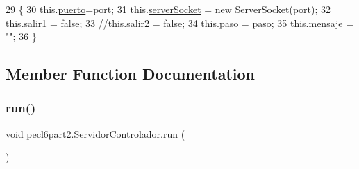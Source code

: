 \begin{DoxyCode}
29                                                                        \{
30       this.\mbox{\hyperlink{classpecl6part2_1_1_servidor_controlador_a685d8d2e3aba27e77af577046faadabe}{puerto}}=port;
31       this.\mbox{\hyperlink{classpecl6part2_1_1_servidor_controlador_ac114e889059ed268a9df9f1dc7447f4b}{serverSocket}} = \textcolor{keyword}{new} ServerSocket(port);
32       this.\mbox{\hyperlink{classpecl6part2_1_1_servidor_controlador_a1721c97ac463f940af370521ac8f78db}{salir1}} = \textcolor{keyword}{false};
33       \textcolor{comment}{//this.salir2 = false;}
34       this.\mbox{\hyperlink{classpecl6part2_1_1_servidor_controlador_a3d1fc8f640e9e8271b06bf8ae9ea1176}{paso}} = \mbox{\hyperlink{classpecl6part2_1_1_servidor_controlador_a3d1fc8f640e9e8271b06bf8ae9ea1176}{paso}};
35       this.\mbox{\hyperlink{classpecl6part2_1_1_servidor_controlador_ac8db190b3104ab20a03976a5411f3bd6}{mensaje}} = \textcolor{stringliteral}{""};
36     \}
\end{DoxyCode}


\subsection{Member Function Documentation}
\mbox{\label{classpecl6part2_1_1_servidor_controlador_a884b191679d749a264476c350c815d75}} 
\subsubsection{\texorpdfstring{run()}{run()}}
{\footnotesize\ttfamily void pecl6part2.\+Servidor\+Controlador.\+run (\begin{DoxyParamCaption}{ }\end{DoxyParamCaption})\hspace{0.3cm}{\ttfamily [inline]}}


